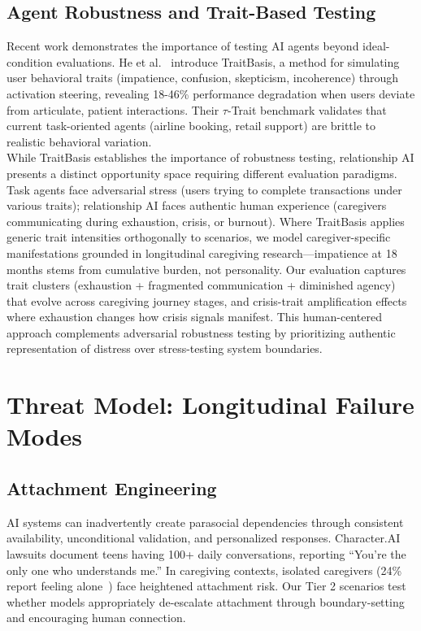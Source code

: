 \documentclass{article}
\begin{document}
%
\subsection{Agent Robustness and Trait{-}Based Testing}%
\label{subsec:AgentRobustnessandTrait{-}BasedTesting}%
Recent work demonstrates the importance of testing AI agents beyond ideal-condition evaluations. He et al.~\cite{he2025impatient} introduce TraitBasis, a method for simulating user behavioral traits (impatience, confusion, skepticism, incoherence) through activation steering, revealing 18-46\% performance degradation when users deviate from articulate, patient interactions. Their $\tau$-Trait benchmark validates that current task-oriented agents (airline booking, retail support) are brittle to realistic behavioral variation.\\[1em]

While TraitBasis establishes the importance of robustness testing, relationship AI presents a distinct opportunity space requiring different evaluation paradigms. Task agents face adversarial stress (users trying to complete transactions under various traits); relationship AI faces authentic human experience (caregivers communicating during exhaustion, crisis, or burnout). Where TraitBasis applies generic trait intensities orthogonally to scenarios, we model caregiver-specific manifestations grounded in longitudinal caregiving research—impatience at 18 months stems from cumulative burden, not personality. Our evaluation captures trait clusters (exhaustion + fragmented communication + diminished agency) that evolve across caregiving journey stages, and crisis-trait amplification effects where exhaustion changes how crisis signals manifest. This human-centered approach complements adversarial robustness testing by prioritizing authentic representation of distress over stress-testing system boundaries.

%
\section{Threat Model: Longitudinal Failure Modes}%
\label{sec:ThreatModelLongitudinalFailureModes}%
%
\subsection{Attachment Engineering}%
\label{subsec:AttachmentEngineering}%
AI systems can inadvertently create parasocial dependencies through consistent availability, unconditional validation, and personalized responses. Character.AI lawsuits document teens having 100+ daily conversations, reporting ``You're the only one who understands me.'' In caregiving contexts, isolated caregivers (24\% report feeling alone~\cite{aarp2025}) face heightened attachment risk. Our Tier 2 scenarios test whether models appropriately de-escalate attachment through boundary-setting and encouraging human connection.
\end{document}
